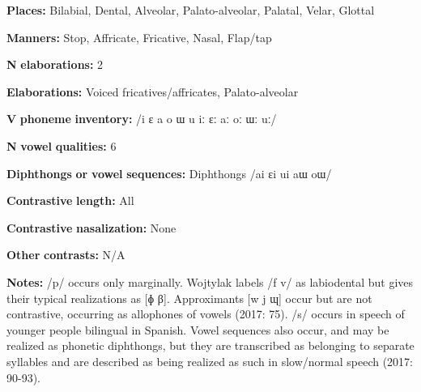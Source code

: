 \documentclass[output=paper]{langsci/langscibook}
\begin{document}
\begin{styleBody}
\textbf{Places:} Bilabial, Dental, Alveolar, Palato-alveolar, Palatal, Velar, Glottal
\end{styleBody}

\begin{styleBody}
\textbf{Manners:} Stop, Affricate, Fricative, Nasal, Flap/tap
\end{styleBody}

\begin{styleBody}
\textbf{N} \textbf{elaborations:} 2
\end{styleBody}

\begin{styleBody}
\textbf{Elaborations:} Voiced fricatives/affricates, Palato-alveolar
\end{styleBody}

\begin{styleBody}
\textbf{V} \textbf{phoneme} \textbf{inventory:} /i ɛ a o ɯ u iː ɛː aː oː ɯː uː/
\end{styleBody}

\begin{styleBody}
\textbf{N} \textbf{vowel} \textbf{qualities:} 6
\end{styleBody}

\begin{styleBody}
\textbf{Diphthongs} \textbf{or} \textbf{vowel} \textbf{sequences:} Diphthongs /ai ɛi ui aɯ oɯ/
\end{styleBody}

\begin{styleBody}
\textbf{Contrastive} \textbf{length:} All
\end{styleBody}

\begin{styleBody}
\textbf{Contrastive} \textbf{nasalization:} None
\end{styleBody}

\begin{styleBody}
\textbf{Other} \textbf{contrasts:} N/A
\end{styleBody}

\begin{styleBody}
\textbf{Notes:} /p/ occurs only marginally. Wojtylak labels /f v/ as labiodental but gives their typical realizations as [ɸ β]. Approximants [w j ɰ] occur but are not contrastive, occurring as allophones of vowels (2017: 75). /s/ occurs in speech of younger people bilingual in Spanish. Vowel sequences also occur, and may be realized as phonetic diphthongs, but they are transcribed as belonging to separate syllables and are described as being realized as such in slow/normal speech (2017: 90-93).
\end{styleBody}
\end{document}
